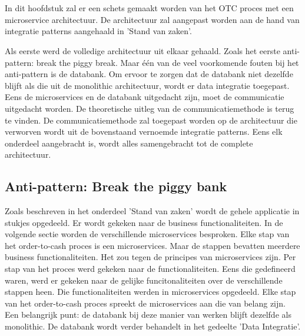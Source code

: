 
\chapter{}
\label{ch:methodologie}

In dit hoofdstuk zal er een schets gemaakt worden van het OTC proces met een microservice architectuur. De architectuur zal aangepast worden aan de hand van integratie patterns aangehaald in 'Stand van zaken'. 

Als eerste werd de volledige architectuur uit elkaar gehaald. Zoals het eerste anti-pattern: break the piggy break. Maar één van de veel voorkomende fouten bij het anti-pattern is de databank. Om ervoor te zorgen dat de databank niet dezelfde blijft als die uit de monolithic architectuur, wordt er data integratie toegepast. Eens de microservices en de databank uitgedacht zijn, moet de communicatie uitgedacht worden. De theoretische uitleg van de communicatiemethode is terug te vinden. De communicatiemethode zal toegepast worden op de architectuur die verworven wordt uit de bovenstaand vernoemde integratie patterns.
Eens elk onderdeel aangebracht is, wordt alles samengebracht tot de complete architectuur.

\section{Anti-pattern: Break the piggy bank}
Zoals beschreven in het onderdeel 'Stand van zaken' wordt de gehele applicatie in stukjes opgedeeld. Er wordt gekeken naar de business functionaliteiten. 
In de volgende sectie worden de verschillende microservices besproken. Elke stap van het order-to-cash proces is een microservices. Maar de stappen bevatten meerdere business functionaliteiten. Het zou tegen de principes van microservices zijn. Per stap van het proces werd gekeken naar de functionaliteiten. Eens die gedefineerd waren, werd er gekeken naar de gelijke funcitonaliteiten over de verschillende stappen heen. Die functionaliteiten werden in microservices opgedeeld. Elke stap van het order-to-cash proces spreekt de microservices aan die van belang zijn. Een belangrijk punt: de databank bij deze manier van werken blijft dezelfde als monolithic. De databank wordt verder behandelt in het gedeelte 'Data Integratie'.

